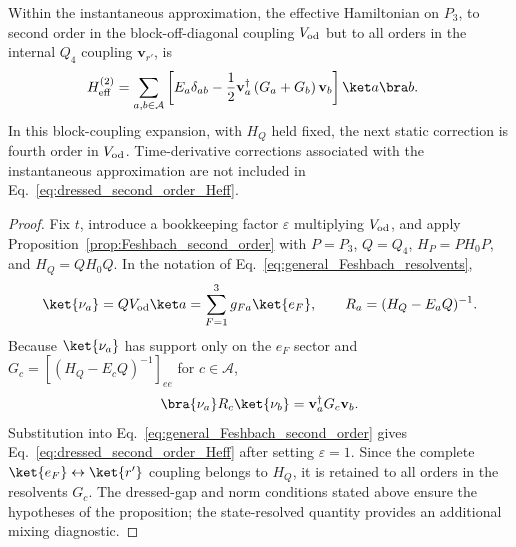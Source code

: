 \begin{theorem}
\label{thm:stark-elimination}
Within the instantaneous approximation, the effective Hamiltonian on $P_3$,
to second order in the block-off-diagonal coupling $V_{\rm od}$ but to all
orders in the internal $Q_4$ coupling $\mathbf v_{r'}$, is
\begin{align}
H_{\rm eff}^{(2)}
&=
\sum_{a,b\in\mathcal A}
\left[
E_a\delta_{ab}
-\frac12\mathbf v_a^\dagger
\left(G_a+G_b\right)
\mathbf v_b
\right]\ket a\bra b.
\label{eq:dressed_second_order_Heff}
\end{align}
In this block-coupling expansion, with $H_Q$ held fixed, the next static
correction is fourth order in $V_{\rm od}$.  Time-derivative corrections
associated with the instantaneous approximation are not included in
Eq.~\eqref{eq:dressed_second_order_Heff}.
\end{theorem}

\begin{proof}
Fix $t$, introduce a bookkeeping factor $\varepsilon$ multiplying
$V_{\rm od}$, and apply Proposition~\ref{prop:Feshbach_second_order} with
$P=P_3$, $Q=Q_4$, $H_P=PH_0P$, and $H_Q=QH_0Q$.  In the notation of
Eq.~\eqref{eq:general_Feshbach_resolvents},
\begin{align}
\ket{\nu_a}
=QV_{\rm od}\ket a
=\sum_{F=1}^3g_{Fa}\ket{e_F},
\qquad
R_a=(H_Q-E_aQ)^{-1}.
\end{align}
Because $\ket{\nu_a}$ has support only on the $e_F$ sector and
$G_c=[(H_Q-E_cQ)^{-1}]_{ee}$ for $c\in\mathcal A$,
\begin{align}
\bra{\nu_a}R_c\ket{\nu_b}
=\mathbf v_a^\dagger G_c\mathbf v_b.
\end{align}
Substitution into Eq.~\eqref{eq:general_Feshbach_second_order} gives
Eq.~\eqref{eq:dressed_second_order_Heff} after setting $\varepsilon=1$.
Since the complete
$\ket{e_F}\leftrightarrow\ket{r'}$ coupling belongs to $H_Q$, it is retained
to all orders in the resolvents $G_c$.  The dressed-gap and norm conditions
stated above ensure the hypotheses of the proposition; the state-resolved
quantity provides an additional mixing diagnostic.
\end{proof}

